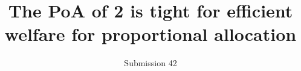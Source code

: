 \documentclass[format=acmsmall, review=false]{acmart}
\title[The PoA of 2 is tight for efficient welfare for proportional allocation]{The PoA of 2 is tight for efficient welfare for proportional allocation}
\author{Submission 42}
\begin{document}
\begin{titlepage}

\maketitle

\vspace{1cm}
\setcounter{tocdepth}{2} %
\tableofcontents

\end{titlepage}








%
%
%
%
%




\appendix
\end{document}
